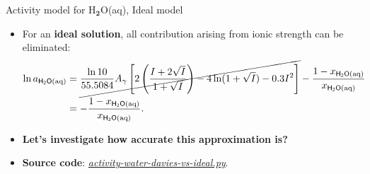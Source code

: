 %
\begin{frame}{Activity model for H$_{\boldsymbol{2}}$O(aq),  Ideal model}
\begin{itemize}[<+->]
\item For an \alert{\textbf{ideal solution}}, all contribution arising from ionic strength
can be eliminated:
\begin{alignat}{2}
\ln a_{\mathsf{H_{2}O\text{(aq)}}} 
& =\cancel{\frac{\ln10}{55.5084}A_{\gamma}\left[2\left(\frac{I+2\sqrt{I}}{1+\sqrt{I}}\right)-4\ln(1+\sqrt{I})-0.3I^{2}\right]}-\frac{1-x_{\mathsf{\mathsf{H_{2}O\text{(aq)}}}}}{x_{\mathsf{\mathsf{H_{2}O\text{(aq)}}}}} \\ 
&=-\frac{1-x_{\mathsf{\mathsf{H_{2}O\text{(aq)}}}}}{x_{\mathsf{\mathsf{H_{2}O\text{(aq)}}}}}.
\end{alignat}
\item \textbf{Let's investigate how accurate this approximation is?} 
\item \textbf{Source code}: \href{https://polybox.ethz.ch/index.php/s/cAmnV8dKZH7AMcK}{\textcolor{indigo(dye)}{\it activity-water-davies-vs-ideal.py}}.
\end{itemize}
\end{frame}
%
%
